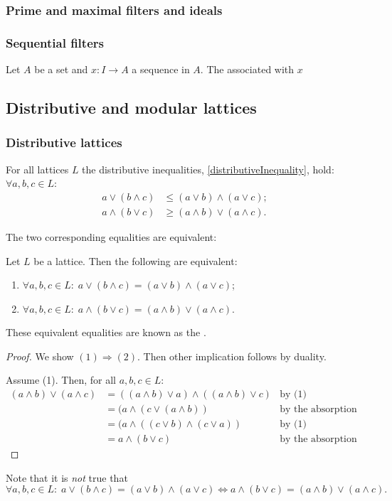 \subsubsection{Prime and maximal filters and ideals}

\subsubsection{Sequential filters}
\begin{definition}
Let $A$ be a set and $x: I\to A$ a sequence in $A$. The  associated with $x$
\end{definition}

\subsection{Distributive and modular lattices}
\subsubsection{Distributive lattices}
For all lattices $L$ the distributive inequalities, \ref{distributiveInequality}, hold: $\forall a,b,c \in L$:
\begin{align*}
a \vee (b\wedge c) &\leq (a\vee b) \wedge (a\vee c); \\
a\wedge (b \vee c) &\geq (a\wedge b)\vee (a\wedge c).
\end{align*}

The two corresponding equalities are equivalent:
\begin{proposition} \label{equivalenceDistributiveLaws}
Let $L$ be a lattice. Then the following are equivalent:
\begin{enumerate}
\item $\forall a,b,c \in L: \; a \vee (b\wedge c) = (a\vee b) \wedge (a\vee c)$;
\item $\forall a,b,c \in L: \; a\wedge (b \vee c) = (a\wedge b)\vee (a\wedge c)$.
\end{enumerate}
\end{proposition}
These equivalent equalities are known as the .
\begin{proof}
We show $(1)\Rightarrow (2)$. Then other implication follows by duality.

Assume (1). Then, for all $a,b,c \in L$:
\begin{align*}
(a\wedge b)\vee (a\wedge c) &= ((a\wedge b)\vee a) \wedge ((a\wedge b)\vee c) & \text{by (1)}\\
&= (a\wedge (c\vee (a\wedge b))  & \text{by the absorption law}\\
&= (a \wedge ((c\vee b) \wedge (c\vee a))  & \text{by (1)}\\
&= a\wedge (b\vee c) & \text{by the absorption law.}
\end{align*}
\end{proof}
Note that it is \emph{not} true that
\[ \forall a,b,c \in L: \; a \vee (b\wedge c) = (a\vee b) \wedge (a\vee c) \iff a\wedge (b \vee c) = (a\wedge b)\vee (a\wedge c). \]

